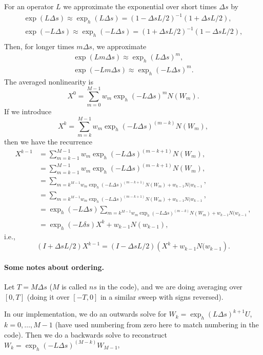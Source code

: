 \documentclass{article}
\begin{document}
For an operator $L$ we approximate the exponential over short times $\Delta s$
by
\begin{align}
  \exp(L\Delta s) \approx \exp_h(L\Delta s) = (1-\Delta s L/2)^{-1}(1 + \Delta s L/2),\\
   \exp(-L\Delta s) \approx \exp_h(-L\Delta s) = (1+\Delta s L/2)^{-1}(1 - \Delta s L/2),\\
\end{align}
Then, for longer times $m\Delta s$, we approximate
\begin{align}
  \exp(Lm\Delta s) \approx \exp_h(L\Delta s)^m,\\
   \exp(-Lm\Delta s) \approx \exp_h(-L\Delta s)^m.
\end{align}
The averaged nonlinearity is
\begin{equation}
  X^0 = \sum_{m=0}^{M-1} w_m \exp_h(-L\Delta s)^m N(W_m).
\end{equation}
If we introduce
\begin{equation}
  X^k = \sum_{m=k}^{M-1} w_m \exp_h(-L\Delta s)^(m-k) N(W_m),
\end{equation}
then we have the recurrence
\begin{align}
  X^{k-1} & = \sum_{m={k-1}}^{M-1} w_m \exp_h(-L\Delta s)^(m-k+1) N(W_m), \\
  & = \sum_{m={k-1}}^{M-1} w_m \exp_h(-L\Delta s)^(m-k+1) N(W_m), \\
  & = \sum_{m=k^{M-1} w_m \exp_h(-L\Delta s)^(m-k+1) N(W_m)
    + w_{k-1}N(w_{k-1}}, \\
    & = \sum_{m=k^{M-1} w_m \exp_h(-L\Delta s)^(m-k+1) N(W_m)
    + w_{k-1}N(w_{k-1}}, \\
  & = \exp_h(-L\Delta s)\sum_{m=k^{M-1} w_m \exp_h(-L\Delta s)^(m-k) N(W_m)
    + w_{k-1}N(w_{k-1}}, \\
  & = \exp_h(-L\delta s)X^k
    + w_{k-1}N(w_{k-1}),
\end{align}
i.e.,
\begin{equation}
(I + \Delta s L/2)X^{k-1} = (I - \Delta s L/2)\left(X^k + w_{k-1}N(w_{k-1}\right).  
\end{equation}

\paragraph{Some notes about ordering.}
Let $T=M\Delta s$ ($M$ is called $ns$ in the code), and we are doing
averaging over $[0,T]$ (doing it over $[-T, 0]$ in a similar sweep
with signs reversed).

In our implementation, we do an outwards
solve for $W_k = \exp_h(L\Delta s)^{k+1} U$, $k=0,\ldots,M-1$ (have used numbering
from zero here to match numbering in the code).
Then we do a backwards solve
to reconstruct $W_k = \exp_h(-L\Delta s)^(M-k) W_{M-1}$, 

\end{document}
